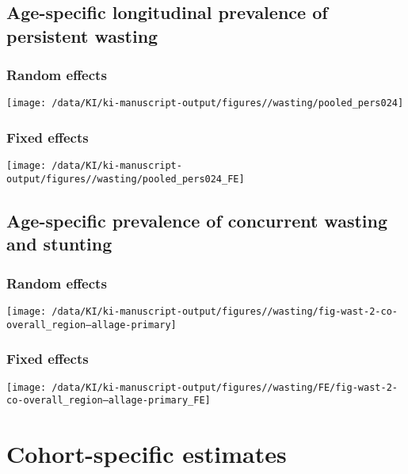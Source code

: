 \documentclass[
  9pt,
]{book}
\begin{document}
\hypertarget{age-specific-longitudinal-prevalence-of-persistent-wasting}{%
\section{Age-specific longitudinal prevalence of persistent wasting}\label{age-specific-longitudinal-prevalence-of-persistent-wasting}}

\hypertarget{random-effects-5}{%
\subsection{Random effects}\label{random-effects-5}}

\texttt{[image: /data/KI/ki-manuscript-output/figures//wasting/pooled\_pers024]}

\hypertarget{fixed-effects-6}{%
\subsection{Fixed effects}\label{fixed-effects-6}}

\texttt{[image: /data/KI/ki-manuscript-output/figures//wasting/pooled\_pers024\_FE]}

\hypertarget{age-specific-prevalence-of-concurrent-wasting-and-stunting}{%
\section{Age-specific prevalence of concurrent wasting and stunting}\label{age-specific-prevalence-of-concurrent-wasting-and-stunting}}

\hypertarget{random-effects-6}{%
\subsection{Random effects}\label{random-effects-6}}

\texttt{[image: /data/KI/ki-manuscript-output/figures//wasting/fig-wast-2-co-overall\_region--allage-primary]}

\hypertarget{fixed-effects-7}{%
\subsection{Fixed effects}\label{fixed-effects-7}}

\texttt{[image: /data/KI/ki-manuscript-output/figures//wasting/FE/fig-wast-2-co-overall\_region--allage-primary\_FE]}

\hypertarget{cohort}{%
\chapter{Cohort-specific estimates}\label{cohort}}
\end{document}
